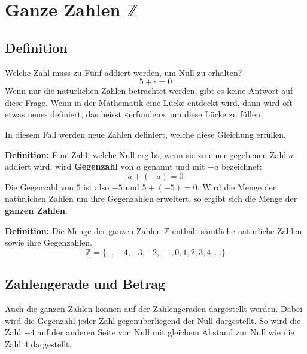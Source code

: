 \newpage
\section{Ganze Zahlen $\mathbb{Z}$}

\subsection{Definition}

Welche Zahl muss zu Fünf addiert werden, um Null zu erhalten?
\[
  5 + \square = 0
\]
Wenn nur die natürlichen Zahlen betrachtet werden, gibt es keine Antwort auf diese Frage. Wenn in der Mathematik eine Lücke entdeckt wird, dann wird oft etwas neues definiert, das heisst «erfunden», um diese Lücke zu füllen.

In diesem Fall werden neue Zahlen definiert, welche diese Gleichung erfüllen.

\textbf{Definition:} Eine Zahl, welche Null ergibt, wenn sie zu einer gegebenen Zahl $a$ addiert wird, wird \textbf{Gegenzahl} von $a$ genannt und mit $-a$ bezeichnet:
\[
  a + (-a) = 0
\]
Die Gegenzahl von $5$ ist also $-5$ und $5 + (-5) = 0$. Wird die Menge der natürlichen Zahlen um ihre Gegenzahlen erweitert, so ergibt sich die Menge der \textbf{ganzen Zahlen}.

\textbf{Definition:} Die Menge der ganzen Zahlen $\mathbb{Z}$ enthält sämtliche natürliche Zahlen sowie ihre Gegenzahlen.
\[
  \mathbb{Z} = \{\ldots -4, -3, -2, -1, 0, 1, 2, 3, 4, \ldots\}
\]

\subsection{Zahlengerade und Betrag}

Auch die ganzen Zahlen können auf der Zahlengeraden dargestellt werden. Dabei wird die Gegenzahl jeder Zahl gegenüberliegend der Null dargestellt. So wird die Zahl $-4$ auf der anderen Seite von Null mit gleichem Abstand zur Null wie die Zahl $4$ dargestellt.
\begin{center}
\end{center}

